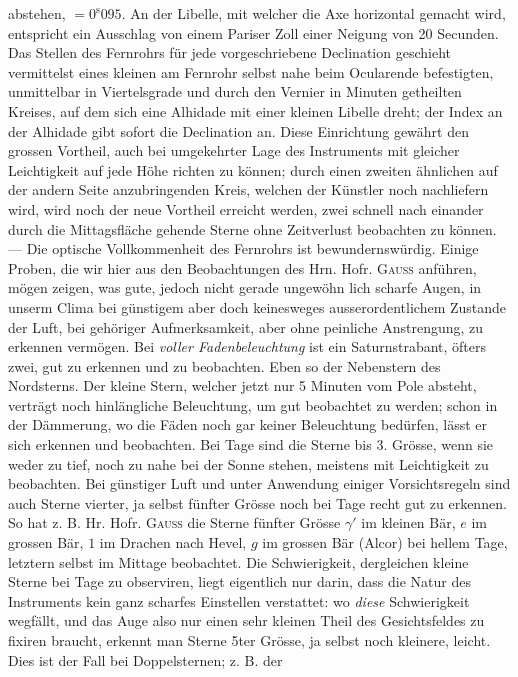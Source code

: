 abstehen, $=0^{\mathrm s}095$. An der Libelle,
mit welcher die Axe horizontal gemacht wird, entspricht ein Ausschlag von einem Pariser Zoll einer
Neigung von 20 Secunden. Das Stellen des Fernrohrs für jede vorgeschriebene Declination geschieht
vermittelst eines kleinen am Fernrohr selbst nahe beim Ocularende befestigten, unmittelbar in Viertelsgrade
und durch den Vernier in Minuten getheilten Kreises, auf dem sich eine Alhidade mit einer
kleinen Libelle dreht; der Index an der Alhidade gibt sofort die Declination an. Diese Einrichtung
gewährt den grossen Vortheil, auch bei umgekehrter Lage des Instruments mit gleicher Leichtigkeit
auf jede Höhe richten zu können; durch einen zweiten ähnlichen auf der andern Seite anzubringenden
Kreis, welchen der Künstler noch nachliefern wird, wird noch der neue Vortheil erreicht werden, zwei
schnell nach einander durch die Mittagsfläche gehende Sterne ohne Zeitverlust beobachten zu können. ---
Die optische Vollkommenheit des Fernrohrs ist bewundernswürdig. Einige Proben, die wir hier aus den
Beobachtungen des Hrn. Hofr. \textsc{Gauss} anführen, mögen zeigen, was gute, jedoch nicht gerade ungewöhn%
%
lich scharfe Augen, in unserm Clima bei günstigem aber doch keinesweges ausserordentlichem Zustande
der Luft, bei gehöriger Aufmerksamkeit, aber ohne peinliche Anstrengung, zu erkennen vermögen. Bei
\emph{voller Fadenbeleuchtung} ist ein Saturnstrabant, öfters zwei, gut zu erkennen und zu beobachten.
Eben so der Nebenstern des Nordsterns. Der kleine Stern, welcher jetzt nur 5 Minuten vom Pole absteht,
verträgt noch hinlängliche Beleuchtung, um gut beobachtet zu werden; schon in der Dämmerung, wo die
Fäden noch gar keiner Beleuchtung bedürfen, lässt er sich erkennen und beobachten. Bei Tage sind die
Sterne bis 3. Grösse, wenn sie weder zu tief, noch zu nahe bei der Sonne stehen, meistens mit
Leichtigkeit zu beobachten. Bei günstiger Luft und unter Anwendung einiger Vorsichtsregeln sind auch
Sterne vierter, ja selbst fünfter Grösse noch bei Tage recht gut zu erkennen. So hat z. B. Hr. Hofr.
\textsc{Gauss} die Sterne fünfter Grösse $\gamma'$ im kleinen Bär, $e$ im grossen Bär, $1$ im Drachen
nach Hevel, $g$ im grossen Bär (Alcor) bei hellem Tage, letztern selbst im Mittage beobachtet. Die
Schwierigkeit, dergleichen kleine Sterne bei Tage zu observiren, liegt eigentlich nur darin, dass die
Natur des Instruments kein ganz scharfes Einstellen verstattet: wo \emph{diese} Schwierigkeit wegfällt,
und das Auge also nur einen sehr kleinen Theil des Gesichtsfeldes zu fixiren braucht, erkennt man
Sterne 5ter Grösse, ja selbst noch kleinere, leicht. Dies ist der Fall bei Doppelsternen; z. B. der
